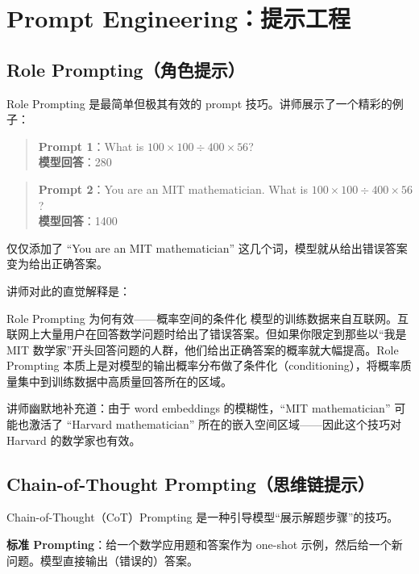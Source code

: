 \documentclass[a4paper]{article}
\begin{document}
\section{Prompt Engineering：提示工程}

\subsection{Role Prompting（角色提示）}

Role Prompting 是最简单但极其有效的 prompt 技巧。讲师展示了一个精彩的例子：

\begin{quote}
\textbf{Prompt 1}：What is $100 \times 100 \div 400 \times 56$? \\
\textbf{模型回答}：280 
\end{quote}

\begin{quote}
\textbf{Prompt 2}：You are an MIT mathematician. What is $100 \times 100 \div 400 \times 56$? \\
\textbf{模型回答}：1400 
\end{quote}

仅仅添加了 ``You are an MIT mathematician'' 这几个词，模型就从给出错误答案变为给出正确答案。

讲师对此的直觉解释是：

\begin{importantbox}{Role Prompting 为何有效——概率空间的条件化}
模型的训练数据来自互联网。互联网上大量用户在回答数学问题时给出了错误答案。但如果你限定到那些以``我是 MIT 数学家''开头回答问题的人群，他们给出正确答案的概率就大幅提高。Role Prompting 本质上是对模型的输出概率分布做了条件化（conditioning），将概率质量集中到训练数据中高质量回答所在的区域。
\end{importantbox}

讲师幽默地补充道：由于 word embeddings 的模糊性，``MIT mathematician'' 可能也激活了 ``Harvard mathematician'' 所在的嵌入空间区域——因此这个技巧对 Harvard 的数学家也有效。

\subsection{Chain-of-Thought Prompting（思维链提示）}

Chain-of-Thought（CoT）Prompting 是一种引导模型``展示解题步骤''的技巧。

\textbf{标准 Prompting}：给一个数学应用题和答案作为 one-shot 示例，然后给一个新问题。模型直接输出（错误的）答案。
\end{document}
